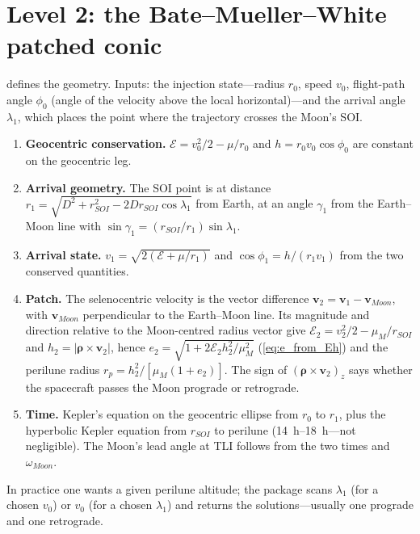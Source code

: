 \documentclass[11pt,letterpaper,oneside]{report}
\newcommand{\En}{\mathcal E}
\newcommand{\bv}[1]{\bm{#1}}
\begin{document}
\section{Level 2: the Bate--Mueller--White patched conic}
 defines the geometry. Inputs: the injection state---radius $r_0$, speed $v_0$,
flight-path angle $\phi_0$ (angle of the velocity above the local horizontal)---and the arrival
angle $\lambda_1$, which places the point where the trajectory crosses the Moon's SOI.
\begin{enumerate}[nosep]
\item \textbf{Geocentric conservation.} $\En=v_0^2/2-\mu/r_0$ and $h=r_0v_0\cos\phi_0$ are
      constant on the geocentric leg.
\item \textbf{Arrival geometry.} The SOI point is at distance $r_1=\sqrt{D^2+r_{SOI}^2-2Dr_{SOI}\cos\lambda_1}$
      from Earth, at an angle $\gamma_1$ from the Earth--Moon line with $\sin\gamma_1=(r_{SOI}/r_1)\sin\lambda_1$.
\item \textbf{Arrival state.} $v_1=\sqrt{2(\En+\mu/r_1)}$ and $\cos\phi_1=h/(r_1v_1)$ from the two conserved quantities.
\item \textbf{Patch.} The selenocentric velocity is the vector difference
      $\bv v_2=\bv v_1-\bv v_{Moon}$, with $\bv v_{Moon}$ perpendicular to the Earth--Moon line.
      Its magnitude and direction relative to the Moon-centred radius vector give
      $\En_2=v_2^2/2-\mu_M/r_{SOI}$ and $h_2=|\bv\rho\times\bv v_2|$, hence
      $e_2=\sqrt{1+2\En_2h_2^2/\mu_M^2}$ (\cref{eq:e_from_Eh}) and the perilune radius $r_p=h_2^2/[\mu_M(1+e_2)]$.
      The sign of $(\bv\rho\times\bv v_2)_z$ says whether the spacecraft passes the Moon
      prograde or retrograde.
\item \textbf{Time.} Kepler's equation on the geocentric ellipse from $r_0$ to $r_1$, plus the
      hyperbolic Kepler equation from $r_{SOI}$ to perilune (\SIrange{14}{18}{h}---not negligible).
      The Moon's lead angle at TLI follows from the two times and $\omega_{Moon}$.
\end{enumerate}
In practice one wants a given perilune altitude; the package scans $\lambda_1$ (for a chosen
$v_0$) or $v_0$ (for a chosen $\lambda_1$) and returns the solutions---usually one prograde and one
retrograde.
\end{document}
